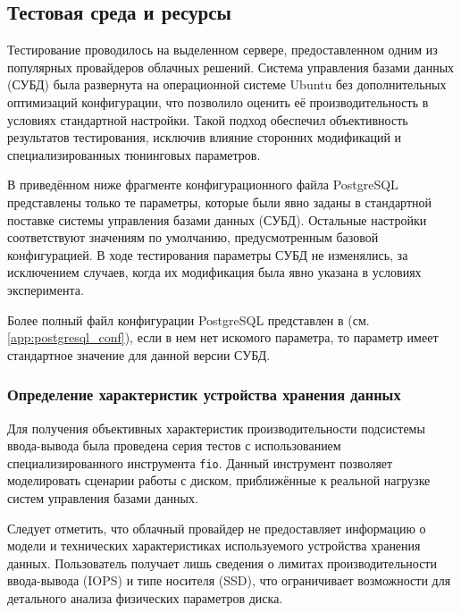 \subsection{Тестовая среда и ресурсы}

Тестирование проводилось на выделенном сервере, предоставленном одним из популярных провайдеров облачных решений. 
Система управления базами данных (СУБД) была развернута на операционной системе Ubuntu без дополнительных оптимизаций конфигурации, 
что позволило оценить её производительность в условиях стандартной настройки. 
Такой подход обеспечил объективность результатов тестирования, исключив влияние сторонних модификаций и специализированных тюнинговых параметров.


В приведённом ниже фрагменте конфигурационного файла PostgreSQL представлены только те параметры, 
которые были явно заданы в стандартной поставке системы управления базами данных (СУБД). 
Остальные настройки соответствуют значениям по умолчанию, предусмотренным базовой конфигурацией. 
В ходе тестирования параметры СУБД не изменялись, за исключением случаев, когда их модификация была явно указана в условиях эксперимента.


Более полный файл конфигурации PostgreSQL представлен в (см. \ref{app:postgresql_conf}), если в нем нет искомого параметра, 
то параметр имеет стандартное значение для данной версии СУБД.

\subsubsection{Определение характеристик устройства хранения данных}

Для получения объективных характеристик производительности подсистемы ввода-вывода была проведена 
серия тестов с использованием специализированного инструмента {\tt fio}. Данный инструмент позволяет 
моделировать сценарии работы с диском, приближённые к реальной нагрузке систем управления базами данных. 

Следует отметить, что облачный провайдер не предоставляет информацию о модели и технических характеристиках используемого устройства хранения данных. 
Пользователь получает лишь сведения о лимитах производительности ввода-вывода (IOPS) и типе носителя (SSD), 
что ограничивает возможности для детального анализа физических параметров диска.

